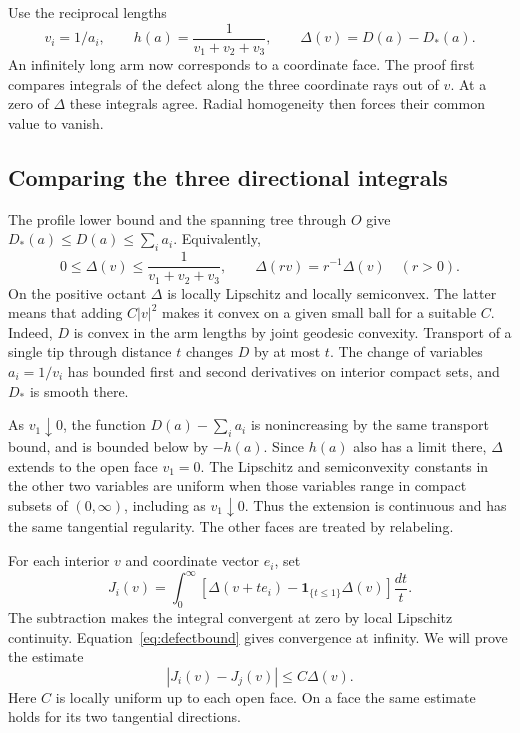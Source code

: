 Use the reciprocal lengths
\[
 v_i=1/a_i,\qquad h(a)=\frac{1}{v_1+v_2+v_3},\qquad
 \Delta(v)=D(a)-D_*(a).
\]
An infinitely long arm now corresponds to a coordinate face.
The proof first compares integrals of the defect along the three
coordinate rays out of $v$. At a zero of $\Delta$ these integrals
agree. Radial homogeneity then forces their common value to vanish.

\subsection{Comparing the three directional integrals}

The profile lower bound and the spanning tree through $O$ give
$D_*(a)\le D(a)\le\sum_i a_i$. Equivalently,
\begin{equation}\label{eq:defectbound}
 0\le \Delta(v)\le\frac{1}{v_1+v_2+v_3},\qquad
 \Delta(rv)=r^{-1}\Delta(v)\quad(r>0).
\end{equation}
On the positive octant $\Delta$ is locally Lipschitz and locally
semiconvex. The latter means that adding $C|v|^2$ makes it convex
on a given small ball for a suitable $C$. Indeed, $D$ is convex in
the arm lengths by joint geodesic convexity. Transport of a single
tip through distance $t$ changes $D$ by at most $t$. The change of
variables $a_i=1/v_i$ has bounded first and second derivatives on
interior compact sets, and $D_*$ is smooth there.

As $v_1\downarrow0$, the function $D(a)-\sum_i a_i$ is
nonincreasing by the same transport bound, and is bounded below by
$-h(a)$. Since $h(a)$ also has a limit there, $\Delta$ extends to the open face $v_1=0$.
The Lipschitz and semiconvexity constants in the other two variables
are uniform when those variables range in compact subsets of
$(0,\infty)$, including as $v_1\downarrow0$. Thus the extension is
continuous and has the same tangential regularity. The other faces
are treated by relabeling.

For each interior $v$ and coordinate vector $e_i$, set
\[
 J_i(v)=\int_0^\infty
 \left[\Delta(v+t e_i)-\mathbf 1_{\{t\le1\}}\Delta(v)\right]
       \frac{dt}{t}.
\]
The subtraction makes the integral convergent at zero by local
Lipschitz continuity. Equation~\eqref{eq:defectbound} gives
convergence at infinity. We will prove the estimate
\begin{equation}\label{eq:src10}
                   |J_i(v)-J_j(v)|\le C\Delta(v).
\end{equation}
Here $C$ is locally uniform up to each open face. On a face the same
estimate holds for its two tangential directions.

